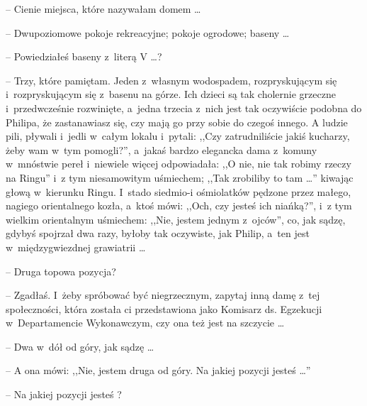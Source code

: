 \documentclass[oneside,polish,11pt,rmheadings]{mwbk}
\begin{document}
-- Cienie miejsca, które nazywałam domem \ldots  

-- Dwupoziomowe pokoje rekreacyjne; pokoje ogrodowe; baseny \ldots  

-- Powiedziałeś baseny z~literą V \ldots ? 

-- Trzy, które pamiętam. Jeden z~własnym wodospadem, rozpryskującym się i~rozpryskującym się z~basenu na górze. Ich dzieci są tak cholernie grzeczne i~przedwcześnie rozwinięte, a~jedna trzecia z~nich jest tak oczywiście podobna do Philipa, że zastanawiasz się, czy mają go przy sobie do czegoś innego. A ludzie pili, pływali i~jedli w~całym lokalu i~pytali: ,,Czy zatrudniliście jakiś kucharzy, żeby wam w~tym pomogli?'', a~jakaś bardzo elegancka dama z~komuny w~mnóstwie pereł i~niewiele więcej odpowiadała: ,,O nie, nie tak robimy rzeczy na Ringu'' i~z tym niesamowitym uśmiechem; ,,Tak zrobiliby to tam  \ldots '' kiwając głową w~kierunku Ringu. I~stado siedmio-i ośmiolatków pędzone przez małego, nagiego orientalnego kozła, a~ktoś mówi: ,,Och, czy jesteś ich niańką?'',  i~z tym wielkim orientalnym uśmiechem: ,,Nie, jestem jednym z~ojców'', co, jak sądzę, gdybyś spojrzał dwa razy, byłoby tak oczywiste, jak Philip, a~ten jest w~międzygwiezdnej grawiatrii \ldots  

-- Druga topowa pozycja? 

-- Zgadłaś. I~żeby spróbować być niegrzecznym, zapytaj inną damę z~tej społeczności, która została ci przedstawiona jako Komisarz ds. Egzekucji w~Departamencie Wykonawczym, czy ona też jest na szczycie \ldots  

-- Dwa w~dół od góry, jak sądzę \ldots  

-- A ona mówi: ,,Nie, jestem druga od góry. Na jakiej pozycji jesteś  \ldots '' 

-- Na jakiej pozycji jesteś ? 
\end{document}
